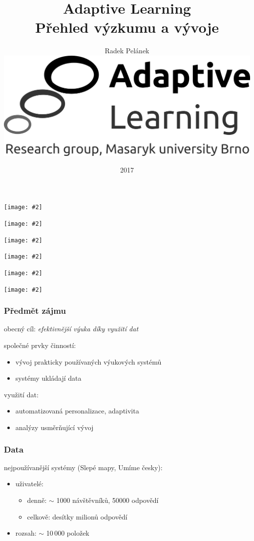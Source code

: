 \documentclass[bigger]{beamer}
\title{Adaptive Learning\\Přehled výzkumu a vývoje}
\author{Radek Pelánek\\[10mm]
  \includegraphics[width=.2\linewidth]{al-logo-researchgroup}}
\date{2017}
\newcommand{\img}[2]{\begin{center}\texttt{[image: \#2]}\end{center}}
\begin{document}
\frame{\titlepage}

\begin{frame}
  \img{1}{slepemapy}
\end{frame}

\begin{frame}
  \img{.9}{anatom}
\end{frame}

\begin{frame}
  \img{.95}{poznavacka}
\end{frame}

\begin{frame}
  \img{.8}{umimecesky}
\end{frame}

\begin{frame}
  \img{.95}{matmat}
\end{frame}

\begin{frame}
  \img{.95}{robomise}
\end{frame}

\begin{frame}
  \frametitle{Předmět zájmu}

  obecný cíl: \emph{efektivnější výuka díky využití dat}

  \bigskip

  společné prvky činností:
  \begin{itemize}
  \item vývoj prakticky používaných výukových systémů
  \item systémy ukládají data
  \end{itemize}

  \bigskip

  využití dat:
  \begin{itemize}
  \item automatizovaná personalizace, adaptivita
  \item analýzy usměrňující vývoj
  \end{itemize}
\end{frame}

\begin{frame}
  \frametitle{Data}

  nejpoužívanější systémy (Slepé mapy, Umíme česky):
  \begin{itemize}
  \item uživatelé:
    \begin{itemize}
    \item denně: $\sim$ 1000 návštěvníků, 50000 odpovědí
    \item celkově: desítky milionů odpovědí
    \end{itemize}
  \item rozsah: $\sim$ 10\,000 položek
  \end{itemize}
\end{frame}
\end{document}
